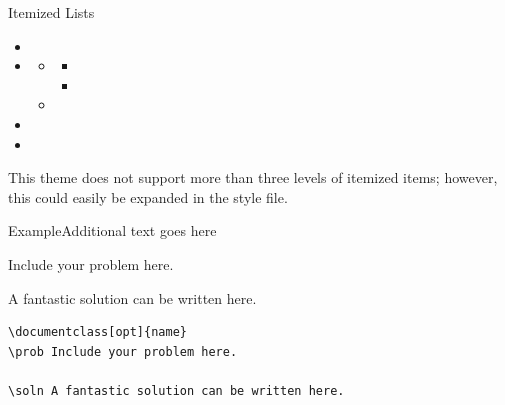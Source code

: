 \documentclass[aspectratio=169, sectionpages]{beamer}
\begin{document}
\begin{frame}[fragile]{Itemized Lists}
	\begin{itemize}
		\item \lipsum[1][1]
		\item \lipsum[1][2]
		      \begin{itemize}
			      \item \lipsum[2][1]
			            \begin{itemize}
				            \item \lipsum[3][1]
				            \item \lipsum[1][2]
			            \end{itemize}
			      \item \lipsum[2][2]
		      \end{itemize}
		\item \lipsum[1][3]
		\item \lipsum[1][4]
	\end{itemize}

	\remarks This theme does not support more than three levels of itemized
	items; however, this could easily be expanded in the style file.

\end{frame}

\begin{frame}{Example}{Additional text goes here}

	\prob Include your problem here.

	\soln A fantastic solution can be written here.

\begin{beamercodeblock}
\begin{verbatim}
\documentclass[opt]{name}
\prob Include your problem here.

\soln A fantastic solution can be written here.
\end{verbatim}
\end{beamercodeblock}
		
		
\end{frame}
\end{document}
